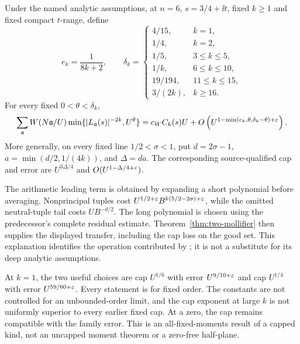 \begin{reported}\label{prop:all-capped}
Under the named analytic assumptions, at $n=6$, $s=3/4+\ii t$, fixed $k\ge1$ and fixed compact $t$-range, define
\[
 e_k=\frac1{8k+2},\qquad
 \delta_k=\begin{cases}
 4/15,&k=1,\\1/4,&k=2,\\1/5,&3\le k\le5,\\
 1/k,&6\le k\le10,\\19/194,&11\le k\le15,\\3/(2k),&k\ge16.
 \end{cases}
\]
For every fixed $0<\theta<\delta_k$,
\begin{align}\label{eq:capped-application}
 \sum_{\mathfrak a}W(N\mathfrak a/U)
 \min\{\lvert L_{\mathfrak a}(s)\rvert^{-2k},U^\theta\}
 =c_W C_k(s)U
 +O\left(U^{1-\min(e_k,\theta,\delta_k-\theta)+\varepsilon}\right).
\end{align}
More generally, on every fixed line $1/2<\sigma<1$, put $d=2\sigma-1$, $a=\min(d/2,1/(4k))$, and $\Delta=da$. The corresponding source-qualified cap and error are $U^{3\Delta/4}$ and $O(U^{1-\Delta/4+\varepsilon})$.
\end{reported}

The arithmetic leading term is obtained by expanding a short polynomial before averaging. Nonprincipal tuples cost
$U^{1/2+\varepsilon}B^{k(5/2-2\sigma)+\varepsilon}$, while the omitted neutral-tuple tail costs $UB^{-d/2}$. The long polynomial is chosen using the predecessor's complete residual estimate. Theorem~\ref{thm:two-mollifier} then supplies the displayed transfer, including the cap loss on the good set. This explanation identifies the operation contributed by \cite{R989}; it is not a substitute for its deep analytic assumptions.

At $k=1$, the two useful choices are cap $U^{1/6}$ with error $U^{9/10+\varepsilon}$ and cap $U^{1/4}$ with error $U^{59/60+\varepsilon}$. Every statement is for fixed order. The constants are not controlled for an unbounded-order limit, and the cap exponent at large $k$ is not uniformly superior to every earlier fixed cap. At a zero, the cap remains compatible with the family error. This is an all-fixed-moments result of a capped kind, not an uncapped moment theorem or a zero-free half-plane.
